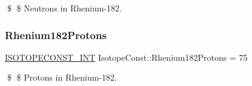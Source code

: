 \$ \$ Neutrons in Rhenium-\/182. \mbox{\label{group___isotope_const-_rhenium-_re182_ga09d6320f94bd8b6e799a35630c6d1748}} 
\subsubsection{\texorpdfstring{Rhenium182\+Protons}{Rhenium182Protons}}
{\footnotesize\ttfamily \mbox{\hyperlink{group___isotope_const-_macros_ga5f18360b3e99483a35c32d789e62621c}{I\+S\+O\+T\+O\+P\+E\+C\+O\+N\+S\+T\+\_\+\+I\+NT}} Isotope\+Const\+::\+Rhenium182\+Protons = 75}

\$ \$ Protons in Rhenium-\/182. 